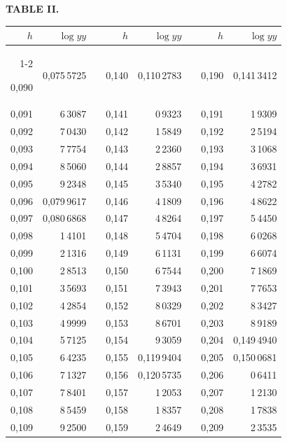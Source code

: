 \endgroup
\clearpage
{}
\begingroup
\centering
\fontsize{9}{9}\selectfont
\setlength{\tabcolsep}{8pt}
\renewcommand{\arraystretch}{1}
\setlength{\parskip}{0pt}
\textbf{TABLE II.}
\par\vspace{7pt}
\begin{tabular}{|r|r|@{}p{9pt}@{}|r|r|@{}p{9pt}@{}|r|r|}
\hline
\rule{0pt}{8.5pt}\(h\) & \(\log yy\) & & \(h\) & \(\log yy\) & & \(h\) & \(\log yy\) \\
\cline{1-2}\cline{4-5}\cline{7-8}
\rule{0pt}{8.5pt}0,090 & 0,075\,5725 &  & 0,140 & 0,110\,2783 &  & 0,190 & 0,141\,3412 \\
0,091 & 6\,3087 &  & 0,141 & 0\,9323 &  & 0,191 & 1\,9309 \\
0,092 & 7\,0430 &  & 0,142 & 1\,5849 &  & 0,192 & 2\,5194 \\
0,093 & 7\,7754 &  & 0,143 & 2\,2360 &  & 0,193 & 3\,1068 \\
0,094 & 8\,5060 &  & 0,144 & 2\,8857 &  & 0,194 & 3\,6931 \\
0,095 & 9\,2348 &  & 0,145 & 3\,5340 &  & 0,195 & 4\,2782 \\[3pt]
0,096 & 0,079\,9617 &  & 0,146 & 4\,1809 &  & 0,196 & 4\,8622 \\
0,097 & 0,080\,6868 &  & 0,147 & 4\,8264 &  & 0,197 & 5\,4450 \\
0,098 & 1\,4101 &  & 0,148 & 5\,4704 &  & 0,198 & 6\,0268 \\
0,099 & 2\,1316 &  & 0,149 & 6\,1131 &  & 0,199 & 6\,6074 \\
0,100 & 2\,8513 &  & 0,150 & 6\,7544 &  & 0,200 & 7\,1869 \\[3pt]
0,101 & 3\,5693 &  & 0,151 & 7\,3943 &  & 0,201 & 7\,7653 \\
0,102 & 4\,2854 &  & 0,152 & 8\,0329 &  & 0,202 & 8\,3427 \\
0,103 & 4\,9999 &  & 0,153 & 8\,6701 &  & 0,203 & 8\,9189 \\
0,104 & 5\,7125 &  & 0,154 & 9\,3059 &  & 0,204 & 0,149\,4940 \\
0,105 & 6\,4235 &  & 0,155 & 0,119\,9404 &  & 0,205 & 0,150\,0681 \\[3pt]
0,106 & 7\,1327 &  & 0,156 & 0,120\,5735 &  & 0,206 & 0\,6411 \\
0,107 & 7\,8401 &  & 0,157 & 1\,2053 &  & 0,207 & 1\,2130 \\
0,108 & 8\,5459 &  & 0,158 & 1\,8357 &  & 0,208 & 1\,7838 \\
0,109 & 9\,2500 &  & 0,159 & 2\,4649 &  & 0,209 & 2\,3535 \\

\end{tabular}
